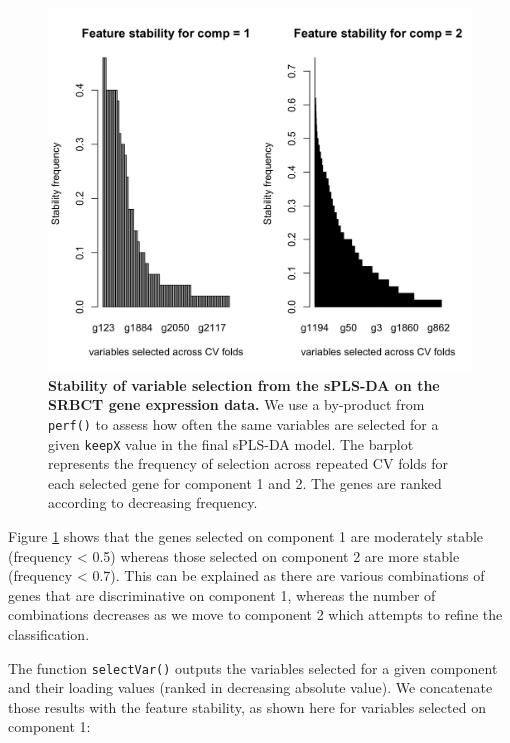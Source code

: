 \documentclass[]{book}
\newenvironment{Shaded}{\begin{snugshade}}{\end{snugshade}}
\newcommand{\CommentTok}[1]{\textcolor[rgb]{0.56,0.35,0.01}{\textit{#1}}}
\newcommand{\DataTypeTok}[1]{\textcolor[rgb]{0.13,0.29,0.53}{#1}}
\newcommand{\DecValTok}[1]{\textcolor[rgb]{0.00,0.00,0.81}{#1}}
\newcommand{\KeywordTok}[1]{\textcolor[rgb]{0.13,0.29,0.53}{\textbf{#1}}}
\newcommand{\NormalTok}[1]{#1}
\newcommand{\OperatorTok}[1]{\textcolor[rgb]{0.81,0.36,0.00}{\textbf{#1}}}
\newcommand{\StringTok}[1]{\textcolor[rgb]{0.31,0.60,0.02}{#1}}
\begin{document}
\begin{figure}

{\centering \includegraphics[width=0.5\linewidth]{Figures/PLSDA/splsda-stability-1} 

}

\caption{\textbf{Stability of variable selection from the sPLS-DA on the SRBCT gene expression data.} We use a by-product from \texttt{perf()} to assess how often the same variables are selected for a given \texttt{keepX} value in the final sPLS-DA model. The barplot represents the frequency of selection across repeated CV folds for each selected gene for component 1 and 2. The genes are ranked according to decreasing frequency.}\label{fig:splsda-stability}
\end{figure}



Figure \ref{fig:splsda-stability} shows that the genes selected on component 1 are moderately stable (frequency \textless{} 0.5) whereas those selected on component 2 are more stable (frequency \textless{} 0.7). This can be explained as there are various combinations of genes that are discriminative on component 1, whereas the number of combinations decreases as we move to component 2 which attempts to refine the classification.

The function \texttt{selectVar()} outputs the variables selected for a given component and their loading values (ranked in decreasing absolute value). We concatenate those results with the feature stability, as shown here for variables selected on component 1:

\begin{Shaded}
\end{Shaded}
\end{document}
